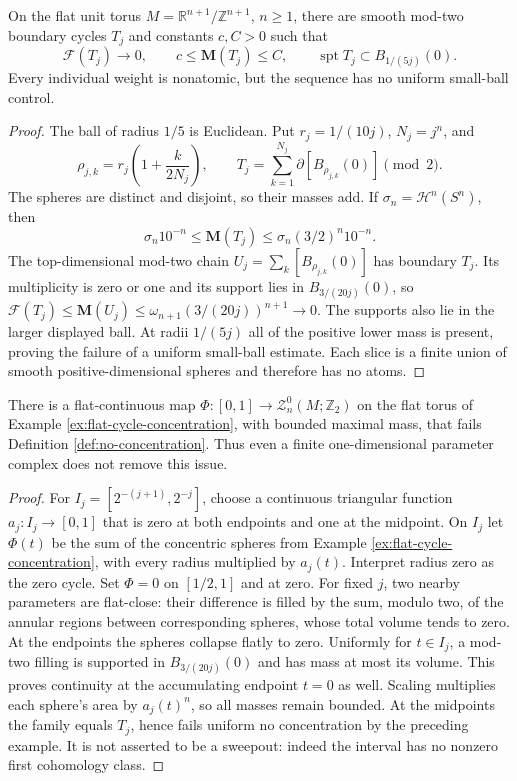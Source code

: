 \begin{example}\label{ex:flat-cycle-concentration}
On the flat unit torus $M=\mathbb R^{n+1}/\mathbb Z^{n+1}$, $n\geq1$, there are smooth mod-two boundary cycles $T_j$ and constants $c,C>0$ such that
\[
 \mathcal F(T_j)\longrightarrow0,\qquad c\leq\mathbf M(T_j)\leq C,
 \qquad \operatorname{spt}T_j\subset B_{1/(5j)}(0).
\]
Every individual weight is nonatomic, but the sequence has no uniform small-ball control.
\end{example}
\begin{proof}
The ball of radius $1/5$ is Euclidean. Put $r_j=1/(10j)$, $N_j=j^n$, and
\[
 \rho_{j,k}=r_j\left(1+\frac{k}{2N_j}\right),\qquad
 T_j=\sum_{k=1}^{N_j}\partial[B_{\rho_{j,k}}(0)]\pmod2.
\]
The spheres are distinct and disjoint, so their masses add. If $\sigma_n=\mathcal H^n(S^n)$, then
\[
 \sigma_n10^{-n}\leq\mathbf M(T_j)
 \leq\sigma_n(3/2)^n10^{-n}.
\]
The top-dimensional mod-two chain $U_j=\sum_k[B_{\rho_{j,k}}(0)]$ has boundary $T_j$. Its multiplicity is zero or one and its support lies in $B_{3/(20j)}(0)$, so
$\mathcal F(T_j)\leq\mathbf M(U_j)\leq\omega_{n+1}(3/(20j))^{n+1}\to0$.
The supports also lie in the larger displayed ball. At radii $1/(5j)$ all of the positive lower mass is present, proving the failure of a uniform small-ball estimate. Each slice is a finite union of smooth positive-dimensional spheres and therefore has no atoms.
\end{proof}

\begin{example}\label{ex:flat-continuous-concentrating-family}
There is a flat-continuous map $\Phi:[0,1]\to\mathcal Z_n^0(M;\mathbb Z_2)$ on the flat torus of Example \ref{ex:flat-cycle-concentration}, with bounded maximal mass, that fails Definition \ref{def:no-concentration}. Thus even a finite one-dimensional parameter complex does not remove this issue.
\end{example}
\begin{proof}
For $I_j=[2^{-(j+1)},2^{-j}]$, choose a continuous triangular function $a_j:I_j\to[0,1]$ that is zero at both endpoints and one at the midpoint. On $I_j$ let $\Phi(t)$ be the sum of the concentric spheres from Example \ref{ex:flat-cycle-concentration}, with every radius multiplied by $a_j(t)$. Interpret radius zero as the zero cycle. Set $\Phi=0$ on $[1/2,1]$ and at zero.
For fixed $j$, two nearby parameters are flat-close: their difference is filled by the sum, modulo two, of the annular regions between corresponding spheres, whose total volume tends to zero. At the endpoints the spheres collapse flatly to zero. Uniformly for $t\in I_j$, a mod-two filling is supported in $B_{3/(20j)}(0)$ and has mass at most its volume. This proves continuity at the accumulating endpoint $t=0$ as well. Scaling multiplies each sphere's area by $a_j(t)^n$, so all masses remain bounded. At the midpoints the family equals $T_j$, hence fails uniform no concentration by the preceding example. It is not asserted to be a sweepout: indeed the interval has no nonzero first cohomology class.
\end{proof}


